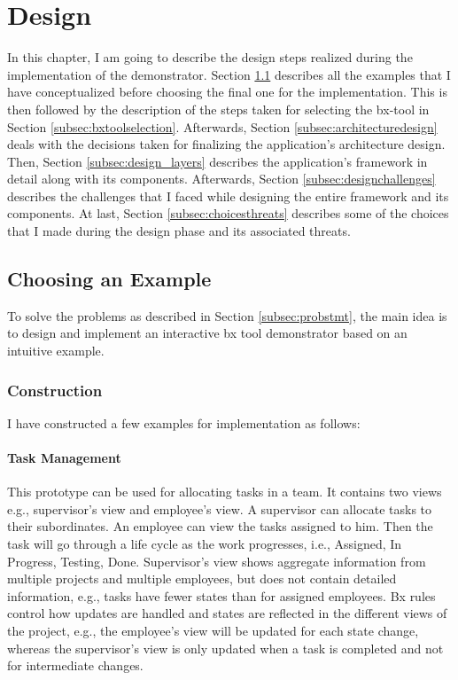 \section{Design}\label{sec:design}
In this chapter, I am going to describe the design steps realized during the implementation of the demonstrator. Section \ref{subsec:exampleforimplementation} describes all the examples that I have conceptualized before choosing the final one for the implementation. This is then followed by the description of the steps taken for selecting the bx-tool in Section \ref{subsec:bxtoolselection}. Afterwards, Section \ref{subsec:architecturedesign} deals with the decisions taken for finalizing the application's architecture design. Then, Section \ref{subsec:design_layers} describes the application's framework in detail along with its components. Afterwards, Section \ref{subsec:designchallenges} describes the challenges that I faced while designing the entire framework and its components. At last, Section \ref{subsec:choicesthreats} describes some of the choices that I made during the design phase and its associated threats. 

\subsection{Choosing an Example}\label{subsec:exampleforimplementation}
To solve the problems as described in Section \ref{subsec:probstmt}, the main idea is to design and implement an interactive bx tool demonstrator based on an intuitive example.

\subsubsection{Construction}\label{subsubsec:exampleconstruction}
I have constructed a few examples for implementation as follows:

\paragraph{Task Management} This prototype can be used for allocating tasks in a team. It contains two views e.g., supervisor's view and employee's view. A supervisor can allocate tasks to their subordinates. An employee can view the tasks assigned to him. Then the task will go through a life cycle as the work progresses, i.e., Assigned, In Progress, Testing, Done. Supervisor's view shows aggregate information from multiple projects and multiple employees, but does not contain detailed information, e.g., tasks have fewer states than for assigned employees. Bx rules control how updates are handled and states are reflected in the different views of the project, e.g., the employee's view will be updated for each state change, whereas the supervisor's view is only updated when a task is completed and not for intermediate changes.

